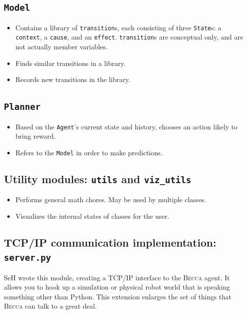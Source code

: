 \subsection{\texttt{Model}}
\begin{itemize}
\item Contains a library of \texttt{transition}s, each consisting of three \texttt{State}s: a \texttt{context}, a \texttt{cause}, and an \texttt{effect}. \texttt{transition}s are conceptual only, and are not actually member variables.
\item Finds similar transitions in a library.
\item Records new transitions in the library.
\end{itemize}

\subsection{\texttt{Planner}}
\begin{itemize}
\item Based on the \texttt{Agent}'s current state and history, chooses an action likely to bring reward.
\item Refers to the \texttt{Model} in order to make predictions.
\end{itemize}

\subsection{Utility modules: \texttt{utils} and \texttt{viz\_utils}}
\begin{itemize}
\item Performs general math chores. May be used by multiple classes.
\item Visualizes the internal states of classes for the user.
\end{itemize}

\subsection{TCP/IP communication implementation: \texttt{server.py}}
SeH wrote this module, creating a TCP/IP interface to the \textsc{Becca} agent. It allows you to hook up a simulation or physical robot world that is speaking something other than Python. This extension enlarges the set of things that \textsc{Becca} can talk to a great deal.

